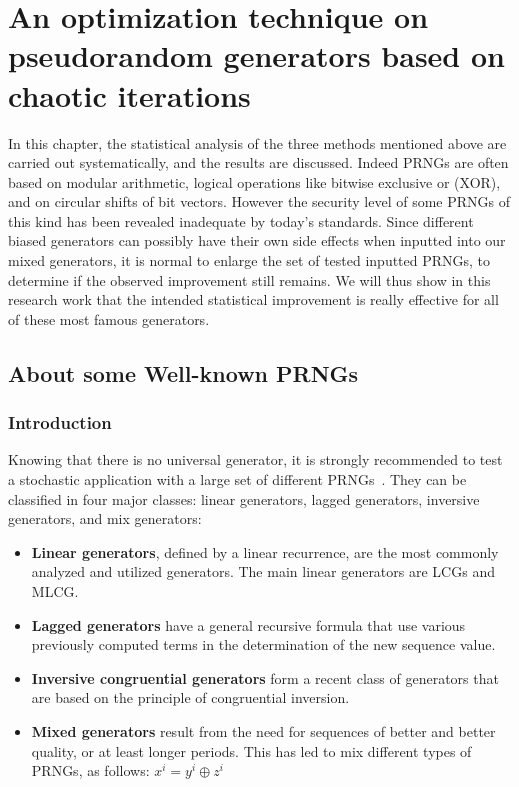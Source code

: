 \chapter{An optimization technique on pseudorandom generators based on chaotic iterations}
\minitoc
In this chapter, the statistical analysis of the three methods mentioned above are carried out systematically, and the results are discussed.
Indeed PRNGs are often based on modular arithmetic, logical operations like bitwise exclusive or (XOR), and on circular shifts of
bit vectors.
However the security level of some PRNGs of this kind has been revealed inadequate by today's standards.
Since different biased generators can possibly have their own side effects when inputted into our mixed generators, it is normal to enlarge the set of tested inputted PRNGs, to determine if the observed improvement still remains.
We will thus show in this research work that the intended statistical improvement is really effective for all of these most famous generators.



\section{About some Well-known PRNGs}
\label{The generation of pseudo-random sequence}

\subsection{Introduction}

Knowing that there is no universal generator, it is strongly recommended to test a stochastic application with a large set of different PRNGs~\cite{DavidRC2003643}. They can be classified in four major classes: linear generators, lagged generators, inversive generators, and mix generators:
\begin{itemize}
 \item \textbf{Linear generators}, defined by a linear recurrence, are the most commonly analyzed and utilized generators. The main linear generators are LCGs and MLCG.
 \item \textbf{Lagged generators} have a general recursive formula that use various previously computed terms in the determination of the new sequence value.
 \item \textbf{Inversive congruential generators} form a recent class of generators that are based on the principle of congruential inversion.
 \item \textbf{Mixed generators} result from the need for sequences of better and better quality, or at least longer periods. This has led to mix different types of PRNGs, as follows: $x^i=y^i\oplus z^i$
\end{itemize}


